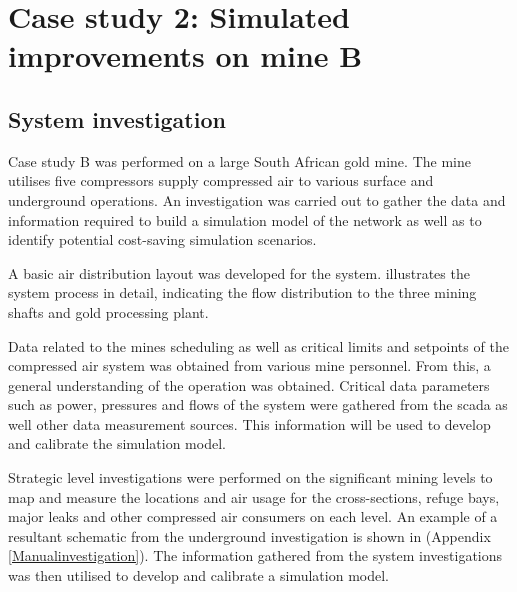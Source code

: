 \section{Case study 2: Simulated improvements on mine B}
	\subsection{System investigation}
	Case study B was performed on a large South African gold mine. The mine utilises five compressors supply compressed air to various surface and underground operations. An investigation was carried out to gather the data and information required to build a simulation model of the network as well as to identify potential cost-saving simulation scenarios.
	\par 
	A basic air distribution layout was developed for the system.  illustrates the system process in detail, indicating the flow distribution to the three mining shafts and gold processing plant.
	\par 
	Data related to the mines scheduling as well as critical limits and setpoints of the compressed air system was obtained from various mine personnel. From this, a general understanding of the operation was obtained.  Critical data parameters such as power, pressures and flows of the system were gathered from the \gls{scada} as well other data measurement sources. This information will be used to develop and calibrate the simulation model.
	\par 
	Strategic level investigations were performed on the significant mining levels to map and measure the locations and air usage for the cross-sections, refuge bays, major leaks and other compressed air consumers on each level. An example of a resultant schematic from the underground investigation is shown in  (Appendix \ref{Manualinvestigation}). The information gathered from the system investigations was then utilised to develop and calibrate a simulation model.
